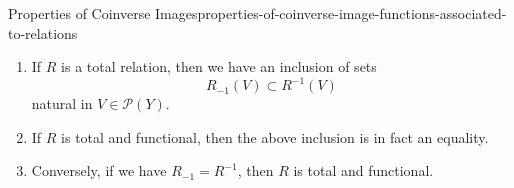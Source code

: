 \begin{proposition}{Properties of Coinverse Images}{properties-of-coinverse-image-functions-associated-to-relations}
\begin{enumerate}
\begin{enumerate}
                \item\label{properties-of-coinverse-image-functions-associated-to-relations-interaction-with-inverse-images-2-a}If $R$ is a total relation, then we have an inclusion of sets
                    \[
                        R_{-1}(V)
                        \subset
                        R^{-1}(V)
                    \]%
                    natural in $V\in\mathcal{P}(Y)$.
                \item\label{properties-of-coinverse-image-functions-associated-to-relations-interaction-with-inverse-images-2-b}If $R$ is total and functional, then the above inclusion is in fact an equality.
                \item\label{properties-of-coinverse-image-functions-associated-to-relations-interaction-with-inverse-images-2-c}Conversely, if we have $R_{-1}=R^{-1}$, then $R$ is total and functional.
            \end{enumerate}
    \end{enumerate}
\end{proposition}
